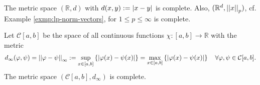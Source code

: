 \begin{exmp}
	The metric space $(\mathbb R, d)$ with $d(x, y) := \left\vert x - y \right\vert$ is \mbox{complete}. Also, $(\mathbb R^{d}, \left\vert\left\vert x \right\vert\right\vert_{p})$, cf. Example \ref{exmp:lp-norm-vectors}, for $1\leq p\leq \infty$ is complete.
\end{exmp}

\begin{exmp}\label{exmp:space-continuous-functions-complete}
	Let $\mathcal C[a, b]$ be the space of all continuous functions $\chi: [a, b]\to\mathbb{R}$ with the metric 
	\begin{align}\label{eq:metric_C[a,b]_real_valued}
		d_{\infty}(\varphi, \psi) = \left\vert\left\vert \varphi - \psi \right\vert\right\vert_{\infty} := \sup_{x\in [a, b]}\left\{ \left\vert \varphi(x) - \psi(x) \right\vert \right\} = \max_{x\in [a, b]}\left\{\left\vert \varphi(x) - \psi(x) \right\vert\right\}\quad \forall \varphi, \psi\in\mathcal C[a, b].
	\end{align}
	The metric space $(\mathcal C[a, b], d_{\infty})$ is complete.
\end{exmp}

